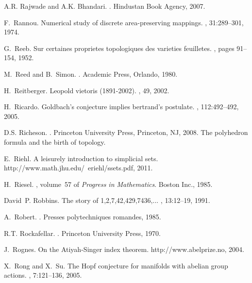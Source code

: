 \documentclass[12pt]{amsart}
\newcounter{example}    \def\example#1{ \item \fontsize{12}{15} \selectfont #1 \fontsize{12}{15} \selectfont }
\begin{document}
\begin{thebibliography}{100}
A.R. Rajwade and A.K. Bhandari.
.
\newblock Hindustan Book Agency, 2007.

F.~Rannou.
\newblock Numerical study of discrete area-preserving mappings.
, 31:289--301, 1974.

G.~Reeb.
\newblock Sur certaines proprietes topologiques des varieties feuilletes.
, pages 91--154, 1952.

M.~Reed and B.~Simon.
.
\newblock Academic Press, Orlando, 1980.

H.~Reitberger.
\newblock Leopold vietoris (1891-2002).
, 49, 2002.

H.~Ricardo.
\newblock Goldbach's conjecture implies bertrand's postulate.
, 112:492--492, 2005.

D.S. Richeson.
.
\newblock Princeton University Press, Princeton, NJ, 2008.
\newblock The polyhedron formula and the birth of topology.

E.~Riehl.
\newblock A leisurely introduction to simplicial sets.
\newblock http://www.math.jhu.edu/~eriehl/ssets.pdf, 2011.

H.~Riesel.
, volume~57
  of {\em Progress in Mathematics}.
 Boston Inc., 1985.

David~P. Robbins.
\newblock The story of 1,2,7,42,429,7436,...
, 13:12--19, 1991.

A.~Robert.
.
\newblock Presses polytechniques romandes, 1985.

R.T. Rockafellar.
.
\newblock Princeton University Press, 1970.

J.~Rognes.
\newblock On the {A}tiyah-{S}inger index theorem.
\newblock http://www.abelprize.no, 2004.

X.~Rong and X.~Su.
\newblock The {H}opf conjecture for manifolds with abelian group actions.
, 7:121--136, 2005.


\end{thebibliography}
\end{document}
